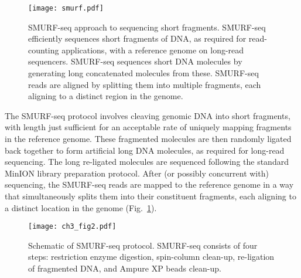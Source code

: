 \begin{figure}[b!]
\centering
\texttt{[image: smurf.pdf]}
\caption[SMURF-seq approach to sequencing short fragments]{
  SMURF-seq approach to sequencing short fragments.
  SMURF-seq efficiently sequences short fragments of DNA, as required
  for read-counting applications, with a reference genome on long-read
  sequencers.
  SMURF-seq sequences short DNA molecules by generating long concatenated
  molecules from these.  SMURF-seq reads are aligned by splitting them
  into multiple fragments, each aligning to a distinct region in the
  genome.}
\label{smurf}
\end{figure}

The SMURF-seq protocol involves cleaving genomic DNA into short
fragments, with length just sufficient for an acceptable rate of
uniquely mapping fragments in the reference genome.  These fragmented
molecules are then randomly ligated back together to form artificial
long DNA molecules, as required for long-read sequencing. The long
re-ligated molecules are sequenced following the standard MinION library
preparation protocol. After (or possibly concurrent with) sequencing,
the SMURF-seq reads are mapped to the reference genome in a way that
simultaneously splits them into their constituent fragments, each
aligning to a distinct location in the genome (Fig.~\ref{smurf}).

\begin{figure}[b!]
\centering
\texttt{[image: ch3\_fig2.pdf]}
\caption[Schematic of SMURF-seq protocol]{
  Schematic of SMURF-seq protocol. SMURF-seq consists of four
  steps: restriction enzyme digestion, spin-column clean-up, re-ligation
  of fragmented DNA, and Ampure XP beads clean-up.}
\label{protocol}
\end{figure}


